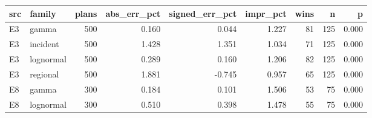 \begin{tabular}{llrrrrrrr}
\toprule
src & family & plans & abs\_err\_pct & signed\_err\_pct & impr\_pct & wins & n & p \\
\midrule
E3 & gamma & 500 & 0.160 & 0.044 & 1.227 & 81 & 125 & 0.000 \\
E3 & incident & 500 & 1.428 & 1.351 & 1.034 & 71 & 125 & 0.000 \\
E3 & lognormal & 500 & 0.289 & 0.160 & 1.206 & 82 & 125 & 0.000 \\
E3 & regional & 500 & 1.881 & -0.745 & 0.957 & 65 & 125 & 0.000 \\
E8 & gamma & 300 & 0.184 & 0.101 & 1.506 & 53 & 75 & 0.000 \\
E8 & lognormal & 300 & 0.510 & 0.398 & 1.478 & 55 & 75 & 0.000 \\
\bottomrule
\end{tabular}
